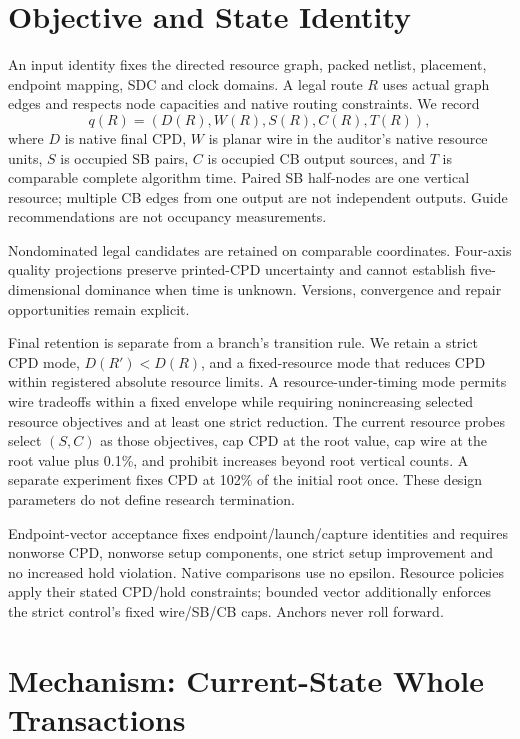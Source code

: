 \documentclass[conference,10pt]{IEEEtran}
\begin{document}
\section{Objective and State Identity}
An input identity fixes the directed resource graph, packed netlist, placement, endpoint mapping, SDC and clock domains. A legal route $R$ uses actual graph edges and respects node capacities and native routing constraints. We record
\begin{equation}
 q(R)=(D(R),W(R),S(R),C(R),T(R)),
\end{equation}
where $D$ is native final CPD, $W$ is planar wire in the auditor's native resource units, $S$ is occupied SB pairs, $C$ is occupied CB output sources, and $T$ is comparable complete algorithm time. Paired SB half-nodes are one vertical resource; multiple CB edges from one output are not independent outputs. Guide recommendations are not occupancy measurements.

Nondominated legal candidates are retained on comparable coordinates. Four-axis quality projections preserve printed-CPD uncertainty and cannot establish five-dimensional dominance when time is unknown. Versions, convergence and repair opportunities remain explicit.

Final retention is separate from a branch's transition rule. We retain a strict CPD mode, $D(R')<D(R)$, and a fixed-resource mode that reduces CPD within registered absolute resource limits. A resource-under-timing mode permits wire tradeoffs within a fixed envelope while requiring nonincreasing selected resource objectives and at least one strict reduction. The current resource probes select $(S,C)$ as those objectives, cap CPD at the root value, cap wire at the root value plus 0.1\%, and prohibit increases beyond root vertical counts. A separate experiment fixes CPD at 102\% of the initial root once. These design parameters do not define research termination.

Endpoint-vector acceptance fixes endpoint/launch/capture identities and requires nonworse CPD, nonworse setup components, one strict setup improvement and no increased hold violation. Native comparisons use no epsilon. Resource policies apply their stated CPD/hold constraints; bounded vector additionally enforces the strict control's fixed wire/SB/CB caps. Anchors never roll forward.

\section{Mechanism: Current-State Whole Transactions}
\end{document}
